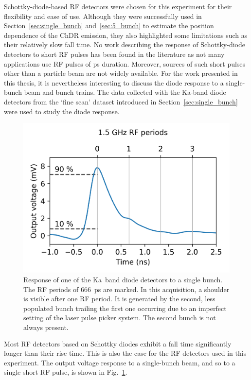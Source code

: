 Schottky-diode-based RF detectors were chosen for this experiment for their flexibility and ease of use. Although they were successfully used in Section~\ref{sec:single_bunch} and~\ref{sec:5_bunch} to estimate the position dependence of the ChDR emission, they also highlighted some limitations such as their relatively slow fall time. No work describing the response of Schottky-diode detectors to short RF pulses has been found in the literature as not many applications use RF pulses of ps duration. Moreover, sources of such short pulses other than a particle beam are not widely available. For the work presented in this thesis, it is nevertheless interesting to discuss the diode response to a single-bunch beam and bunch trains. The data collected with the Ka-band diode detectors from the `fine scan' dataset introduced in Section~\ref{sec:single_bunch} were used to study the diode response.



\begin{figure}[!b]
\centering
\includegraphics[scale=0.8, keepaspectratio]{pictures/Pulse_raise_fall}
\caption{Response of one of the Ka~band diode detectors to a single bunch. The RF periods of 666~ps are marked. In this acquisition, a shoulder is visible after one RF period. It is generated by the second, less populated bunch trailing the first one occurring due to an imperfect setting of the laser pulse picker system. The second bunch is not always present.}
\label{fig:diode_pulse}
\end{figure}

 Most RF detectors based on Schottky diodes exhibit a fall time significantly longer than their rise time. This is also the case for the RF detectors used in this experiment. The output voltage response to a single-bunch beam, and so to a single short RF pulse, is shown in Fig.~\ref{fig:diode_pulse}. 

